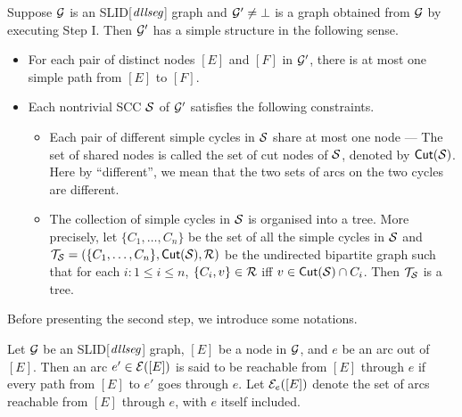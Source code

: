 \documentclass{llncs}
\newcommand\cutn{\mathsf{Cut}}
\begin{document}
\begin{proposition}\label{prop-unique-path}
Suppose $\mathcal{G}$ is an SLID[$\mathit{dllseg}$] graph and $\mathcal{G}' \neq \bot$ is a graph obtained from $\mathcal{G}$ by executing Step I. Then $\mathcal{G}'$ has a simple structure in the following sense.
\begin{itemize}
\item For each pair of distinct nodes $[E]$ and $[F]$ in $\mathcal{G}'$, there is at most one simple path from $[E]$ to $[F]$.
%
\item Each nontrivial SCC $\mathcal{S}$ of $\mathcal{G}'$ satisfies the following constraints.
\begin{itemize}
\item Each pair of different simple cycles in $\mathcal{S}$ share at most one node --- The set of shared nodes is called the set of cut nodes of $\mathcal{S}$, denoted by $\cutn(\Ss)$. Here by ``different'', we mean that the two sets of arcs on the two cycles are different.
\item
The collection of simple cycles in $\mathcal{S}$ is organised into a tree. More precisely, let $\{C_1,\dots,C_n\}$ be the set of all the simple cycles in $\mathcal{S}$ and $\Tt_\Ss=(\{C_1,\dots,C_n\}, \cutn(\Ss), \Rr)$ be the undirected bipartite  graph such that for each $i: 1 \le i \le n$, $\{C_i, v\} \in \mathcal{R}$ iff $v \in \cutn(\Ss) \cap C_i$. Then $\mathcal{T}_{\mathcal{S}}$ is a tree.
\end{itemize}
\end{itemize}
\end{proposition}

Before presenting the second step, we introduce some notations.

\begin{definition}
Let $\mathcal{G}$ be an SLID[$\mathit{dllseg}$] graph, $[E]$ be a node in $\mathcal{G}$, and $e$ be an arc out of $[E]$. Then an arc $e' \in \mathcal{E}([E])$ is said to be reachable from $[E]$ through $e$ if every path from $[E]$ to $e'$ goes through $e$. Let $\mathcal{E}_{e}([E])$ denote the set of arcs reachable from $[E]$ through $e$, with $e$ itself included.
\end{definition}
\end{document}
